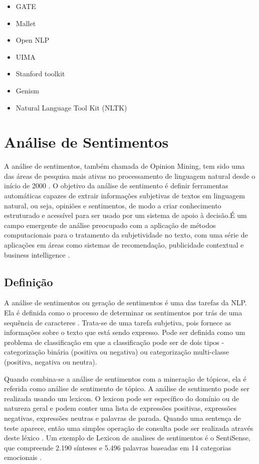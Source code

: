 \documentclass[
	12pt,				%
	openright,			%
	oneside,			%
	a4paper,			%
	english,			%
	spanish,			%
	brazil				%
	]{abntex2}
\begin{document}
	\begin{itemize}
	 	\item GATE
	 	\item Mallet
	 	\item Open NLP
	 	\item UIMA
	 	\item Stanford toolkit
	 	\item Genism
	 	\item Natural Language Tool Kit (NLTK)
	\end{itemize}
	
	\section{Análise de Sentimentos}
		A análise de sentimentos, também chamada de Opinion Mining, tem sido uma das áreas de pesquisa mais ativas no processamento de linguagem natural desde o início de 2000 \cite{bliu_2012}. O objetivo da análise de sentimento é definir ferramentas automáticas capazes de extrair informações subjetivas de textos em linguagem natural, ou seja, opiniões e sentimentos, de modo a criar conhecimento estruturado e acessível para ser usado por um sistema de apoio à decisão.É um campo emergente de análise preocupado com a aplicação de métodos computacionais para o tratamento da subjetividade no texto, com uma série de aplicações em áreas como sistemas de recomendação, publicidade contextual e business intelligence \cite{book_discover_practices}.

	\subsection*{Definição}
	
	A análise de sentimentos ou geração de sentimentos é uma das tarefas da NLP. Ela é definida como o processo de determinar os sentimentos por trás de uma sequência de caracteres \cite{book_natlang_python}. Trata-se de uma tarefa subjetiva, pois fornece as informações sobre o texto que está sendo expresso. Pode ser definida como um problema de classificação em que a classificação pode ser de dois tipos - categorização binária (positiva ou negativa) ou categorização multi-classe (positiva, negativa ou neutra). 
	
Quando combina-se a análise de sentimentos com a mineração de tópicos, ela é referida como análise de sentimento de tópico. A análise de sentimento pode ser realizada usando um lexicon. O lexicon pode ser específico do domínio ou de natureza geral e podem conter uma lista de expressões positivas, expressões negativas, expressões neutras e palavras de parada. Quando uma sentença de teste aparece, então uma simples operação de consulta pode ser realizada através deste léxico \cite{book_natlang_python}. Um exemplo de Lexicon de analises de sentimentos é o SentiSense, que compreende 2.190 sínteses e 5.496 palavras baseadas em 14 categorias emocionais \cite{carrilho}.
\end{document}
